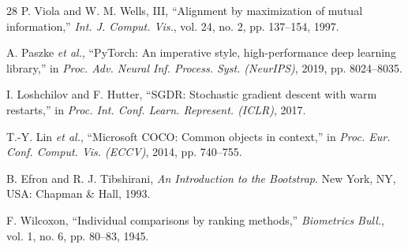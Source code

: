 \documentclass[journal]{IEEEtran}
\begin{document}
\begin{thebibliography}{28}
P. Viola and W. M. Wells, III, ``Alignment by maximization of mutual information,'' \emph{Int. J. Comput. Vis.}, vol. 24, no. 2, pp. 137--154, 1997.

A. Paszke \emph{et al.}, ``PyTorch: An imperative style, high-performance deep learning library,'' in \emph{Proc. Adv. Neural Inf. Process. Syst. (NeurIPS)}, 2019, pp. 8024--8035.

I. Loshchilov and F. Hutter, ``SGDR: Stochastic gradient descent with warm restarts,'' in \emph{Proc. Int. Conf. Learn. Represent. (ICLR)}, 2017.

T.-Y. Lin \emph{et al.}, ``Microsoft COCO: Common objects in context,'' in \emph{Proc. Eur. Conf. Comput. Vis. (ECCV)}, 2014, pp. 740--755.

B. Efron and R. J. Tibshirani, \emph{An Introduction to the Bootstrap}. New York, NY, USA: Chapman \& Hall, 1993.

F. Wilcoxon, ``Individual comparisons by ranking methods,'' \emph{Biometrics Bull.}, vol. 1, no. 6, pp. 80--83, 1945.

\end{thebibliography}
\end{document}
